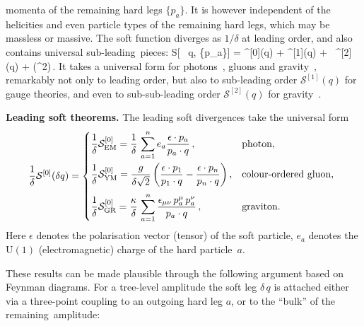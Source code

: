momenta of the remaining hard legs $\{p_{a}\}$. It is however independent  of 
the helicities and even particle types of the remaining hard legs, which may be massless or massive. 
The soft function diverges as $1/\delta$ at leading order, and also contains universal sub-leading~pieces:
\be
\label{softtheoremgeneral}
 S[ \delta\,   q, \{p_{a}\}] =  ^{[0]}(q) + ^{[1]}(q)
 + \delta\, ^{[2]}(q)  + \cO\bigl(\delta^{2}\bigr)\,.
 \ee
 It takes a universal form for photons~\cite{ch2_Low:1958sn}, gluons and gravity~\cite{ch2_Weinberg:1964ew}, remarkably not only
 to leading order, but also to sub-leading order $\mathcal{S}^{[1]}(q)$ for gauge theories, and even to
sub-sub-leading order $\mathcal{S}^{[2]}(q)$ for gravity~\cite{ch2_Cachazo:2014fwa}. 

\begin{svgraybox}{\bf Leading soft theorems.}
The leading soft divergences take the universal form 
%
\begin{equation}
 \frac{1}{\delta} \mathcal{S}^{[0]}(\delta  q)= \begin{cases} 
  \displaystyle \frac{1}{\delta} {\cal S}^{[0]}_\text{EM} = \frac{1}{\delta} \,
    \sum_{a=1}^{n} e_{a}\frac{\epsilon\cdot p_{a}}{p_{a}\cdot q} \,, & \text{photon, }\\[12pt]  

  \displaystyle \frac{1}{\delta} {\cal S}^{[0]}_\text{YM} = \frac{g}{\delta\sqrt{2}} \,
    \bigg(\frac{\epsilon\cdot p_{1}}{p_{1}\cdot q}-\frac{\epsilon\cdot p_{n}}{p_{n}\cdot q}\bigg)\,, & \text{colour-ordered gluon, }\\[12pt]  
    \displaystyle \frac{1}{\delta} {\cal S}^{[0]}_\text{GR} = \frac{\kappa}{\delta} \, 
    \sum_{a=1}^{n}  \frac{\epsilon_{\mu\nu}\, p_{a}^{\mu}\, p_{a}^{\nu}}{p_{a} \cdot q} \,,
    &\text{graviton. } \end{cases}
  \label{eq:S0explicit}
\end{equation}
%
Here $\epsilon$ denotes the polarisation vector (tensor) of the soft particle,  $e_{a}$ denotes the $\text{U}(1)$  (electromagnetic) charge of the hard particle~$a$. 
\end{svgraybox}
%
These results can be made plausible through the following argument based on Feynman diagrams. For a tree-level amplitude the soft leg $\delta \, q$ is attached
either via a three-point coupling to an outgoing hard leg $a$, or to the ``bulk'' of the remaining~amplitude:
%
\be
{} 
